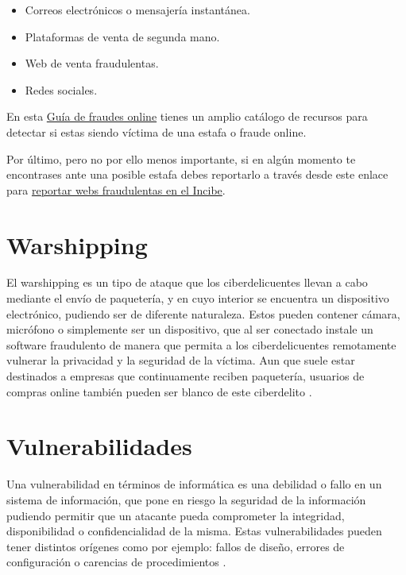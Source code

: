 \documentclass[
  a4paper,
  openany]{book}
\begin{document}
\begin{itemize}
\item
  Correos electrónicos o mensajería instantánea.
\item
  Plataformas de venta de segunda mano.
\item
  Web de venta fraudulentas.
\item
  Redes sociales.
\end{itemize}

En esta \href{https://www.osi.es/es/guia-fraudes-online}{Guía de fraudes online} tienes un amplio catálogo de recursos para detectar si estas siendo víctima de una estafa o fraude online.

Por último, pero no por ello menos importante, si en algún momento te encontrases ante una posible estafa debes reportarlo a través desde este enlace para \href{https://www.incibe.es/protege-tu-empresa/reporte-fraude}{reportar webs fraudulentas en el Incibe}.

\hypertarget{warshipping}{%
\section{Warshipping}\label{warshipping}}

El warshipping es un tipo de ataque que los ciberdelicuentes llevan a cabo mediante el envío de paquetería, y en cuyo interior se encuentra un dispositivo electrónico, pudiendo ser de diferente naturaleza. Estos pueden contener cámara, micrófono o simplemente ser un dispositivo, que al ser conectado instale un software fraudulento de manera que permita a los ciberdelicuentes remotamente vulnerar la privacidad y la seguridad de la víctima. Aun que suele estar destinados a empresas que continuamente reciben paquetería, usuarios de compras online también pueden ser blanco de este ciberdelito \citep{INCI-warshipping}.

\hypertarget{vulnerabilidades}{%
\section{Vulnerabilidades}\label{vulnerabilidades}}

Una vulnerabilidad en términos de informática es una debilidad o fallo en un sistema de información, que pone en riesgo la seguridad de la información pudiendo permitir que un atacante pueda comprometer la integridad, disponibilidad o confidencialidad de la misma. Estas vulnerabilidades pueden tener distintos orígenes como por ejemplo: fallos de diseño, errores de configuración o carencias de procedimientos \citep{INCI-vulnerabilidad}.
\end{document}
